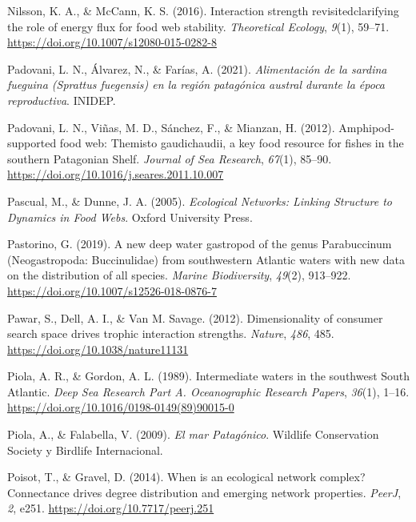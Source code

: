 \documentclass[preprint, 3p,
authoryear]{elsarticle} %
\newlength{\cslhangindent}
\newlength{\cslentryspacingunit} %
\newenvironment{CSLReferences}[2] %
 {%
  \setlength{\parindent}{0pt}
  \ifodd #1
  \let\oldpar\par
  \def\par{\hangindent=\cslhangindent\oldpar}
  \fi
  \setlength{\parskip}{#2\cslentryspacingunit}
 }%
 {}
\begin{document}
\begin{CSLReferences}{1}{0}
\leavevmode{}%
Nilsson, K. A., \& McCann, K. S. (2016). Interaction strength
revisited\textemdash clarifying the role of energy flux for food web
stability. \emph{Theoretical Ecology}, \emph{9}(1), 59--71.
\url{https://doi.org/10.1007/s12080-015-0282-8}

\leavevmode{}%
Padovani, L. N., Álvarez, N., \& Farías, A. (2021). \emph{Alimentación
de la sardina fueguina ({Sprattus} fuegensis) en la región patagónica
austral durante la época reproductiva}. {INIDEP}.

\leavevmode{}%
Padovani, L. N., Viñas, M. D., Sánchez, F., \& Mianzan, H. (2012).
Amphipod-supported food web: {Themisto} gaudichaudii, a key food
resource for fishes in the southern {Patagonian Shelf}. \emph{Journal of
Sea Research}, \emph{67}(1), 85--90.
\url{https://doi.org/10.1016/j.seares.2011.10.007}

\leavevmode{}%
Pascual, M., \& Dunne, J. A. (2005). \emph{Ecological {Networks}:
{Linking Structure} to {Dynamics} in {Food Webs}}. {Oxford University
Press}.

\leavevmode{}%
Pastorino, G. (2019). A new deep water gastropod of the genus
{Parabuccinum} ({Neogastropoda}: {Buccinulidae}) from southwestern
{Atlantic} waters with new data on the distribution of all species.
\emph{Marine Biodiversity}, \emph{49}(2), 913--922.
\url{https://doi.org/10.1007/s12526-018-0876-7}

\leavevmode{}%
Pawar, S., Dell, A. I., \& Van M. Savage. (2012). Dimensionality of
consumer search space drives trophic interaction strengths.
\emph{Nature}, \emph{486}, 485.
\url{https://doi.org/10.1038/nature11131}

\leavevmode{}%
Piola, A. R., \& Gordon, A. L. (1989). Intermediate waters in the
southwest {South Atlantic}. \emph{Deep Sea Research Part A.
Oceanographic Research Papers}, \emph{36}(1), 1--16.
\url{https://doi.org/10.1016/0198-0149(89)90015-0}

\leavevmode{}%
Piola, A., \& Falabella, V. (2009). \emph{El mar {Patagónico}}.
{Wildlife Conservation Society y Birdlife Internacional}.

\leavevmode{}%
Poisot, T., \& Gravel, D. (2014). When is an ecological network complex?
{Connectance} drives degree distribution and emerging network
properties. \emph{PeerJ}, \emph{2}, e251.
\url{https://doi.org/10.7717/peerj.251}


\end{CSLReferences}
\end{document}
